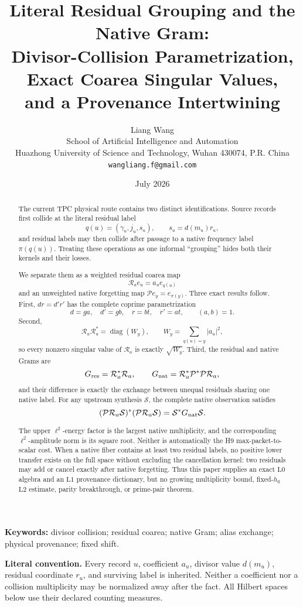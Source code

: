 \documentclass[11pt]{article}
\title{\textbf{Literal Residual Grouping and the Native Gram:}\\
Divisor-Collision Parametrization, Exact Coarea Singular Values,\\
and a Provenance Intertwining}
\author{Liang Wang\\
School of Artificial Intelligence and Automation\\
Huazhong University of Science and Technology, Wuhan 430074, P.R. China\\
\texttt{wangliang.f@gmail.com}}
\date{July 2026}
\theoremstyle{definition}
\theoremstyle{remark}
\newcommand{\Lzero}{\mathrm{L0}}
\newcommand{\Lone}{\mathrm{L1}}
\newcommand{\Ltwo}{\mathrm{L2}}
\newcommand{\Res}{\mathcal R}
\newcommand{\Nat}{\mathcal P}
\newcommand{\Syn}{\mathcal S}
\begin{document}
\maketitle

\begin{abstract}
The current TPC physical route contains two distinct identifications.
Source records first collide at the literal residual label
\[
 q(u)=(\gamma_u,j_u,s_u),\qquad s_u=d(m_u)r_u,
\]
and residual labels may then collide after passage to a native
frequency label \(\pi(q(u))\).  Treating these operations as one
informal ``grouping'' hides both their kernels and their losses.

We separate them as a weighted residual coarea map
\[
 \Res_a e_u=a_u e_{q(u)}
\]
and an unweighted native forgetting map
\(\Nat e_y=e_{\pi(y)}\).  Three exact results follow.  First,
\(dr=d'r'\) has the complete coprime parametrization
\[
 d=ga,\quad d'=gb,\quad r=bt,\quad r'=at,
 \qquad (a,b)=1.
\]
Second,
\[
 \Res_a\Res_a^*=\operatorname{diag}(W_y),
 \qquad
 W_y=\sum_{q(u)=y}|a_u|^2,
\]
so every nonzero singular value of \(\Res_a\) is exactly
\(\sqrt{W_y}\).  Third, the residual and native Grams are
\[
 G_{\rm res}=\Res_a^*\Res_a,\qquad
 G_{\rm nat}=\Res_a^*\Nat^*\Nat\Res_a,
\]
and their difference is exactly the exchange between unequal
residuals sharing one native label.  For any upstream synthesis
\(\Syn\), the complete native observation satisfies
\[
 (\Nat\Res_a\Syn)^*(\Nat\Res_a\Syn)
 =\Syn^*G_{\rm nat}\Syn.
\]

The upper \(\ell^2\)-energy factor is the largest native multiplicity,
and the corresponding \(\ell^2\)-amplitude norm is its square root.
Neither is automatically the H9 max-packet-to-scalar cost.  When a
native fiber contains at least two residual labels, no positive lower
transfer exists on the full space without excluding the cancellation
kernel: two residuals may add or cancel exactly after native
forgetting.  Thus this paper supplies an exact \(\Lzero\) algebra and
an \(\Lone\) provenance dictionary, but no growing multiplicity
bound, fixed-\(h_0\) \(\Ltwo\) estimate, parity breakthrough, or
prime-pair theorem.
\end{abstract}

\noindent\textbf{Keywords:}
divisor collision; residual coarea; native Gram; alias exchange;
physical provenance; fixed shift.

\medskip
\noindent\textbf{Literal convention.}
Every record \(u\), coefficient \(a_u\), divisor value \(d(m_u)\),
residual coordinate \(r_u\), and surviving label is inherited.
Neither a coefficient nor a collision multiplicity may be normalized
away after the fact.  All Hilbert spaces below use their declared
counting measures.
\end{document}
